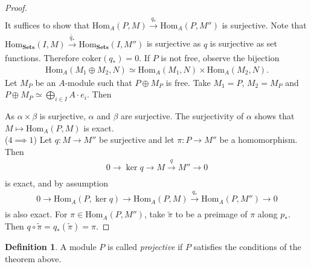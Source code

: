 \documentclass[12pt]{report}
\theoremstyle{plain}
\theoremstyle{remark}
\theoremstyle{definition}
\newtheorem{definition}[theorem]{Definition}
\newcommand{\Hom}[3]{\mathrm{Hom}_{#3}(#1,#2)}
\begin{document}
\begin{proof}
\begin{align*}
    \end{align*}
    It suffices to show that $\Hom{P}{M}{A}\xrightarrow[]{q_*} \Hom{P}{M''}{A}$ is surjective. Note that $\Hom{I}{M}{\mathbf{Sets}}\xrightarrow[]{\tilde{q_*}} \Hom{I}{M''}{\mathbf{Sets}}$ is surjective as $q$ is surjective as set functions. Therefore $\mathrm{coker}(q_*)=0$. If $P$ is not free, observe the bijection
    \begin{align*}
        \Hom{M_1\oplus M_2}{N}{A}\simeq \Hom{M_1}{N}{A}\times \Hom{M_2}{N}{A}.
    \end{align*}
    Let $M_P$ be an $A$-module such that $P\oplus M_P$ is free. Take $M_1=P$, $M_2=M_P$ and $P\oplus M_P\simeq \bigoplus_{i\in I} A\cdot e_i$. Then
    \begin{figure}[H]
        \centering
    \end{figure}
    \noindent As $\alpha\times\beta$ is surjective, $\alpha$ and $\beta$ are surjective. The surjectivity of $\alpha$ shows that $M\mapsto \Hom{P}{M}{A}$ is exact. \\
    ($4\implies 1$) Let $q:M\rightarrow M''$ be surjective and let $\pi:P\rightarrow M''$ be a homomorphism. Then
    \begin{align*}
        0\rightarrow \ker q\rightarrow M\xrightarrow[]{q} M''\rightarrow 0
    \end{align*}
    is exact, and by assumption
    \begin{align*}
        0\rightarrow \Hom{P}{\ker q}{A}\rightarrow \Hom{P}{M}{A}\xrightarrow[]{q_*} \Hom{P}{M''}{A}\rightarrow 0
    \end{align*}
    is also exact. For $\pi\in\Hom{P}{M''}{A}$, take $\tilde{\pi}$ to be a preimage of $\pi$ along $p_*$. Then $q\circ \tilde{\pi} = q_*(\tilde{\pi})=\pi$.
\end{proof}

\begin{definition}
    A module $P$ is called \emph{projective} if $P$ satisfies the conditions of the theorem above.
\end{definition}
\end{document}
